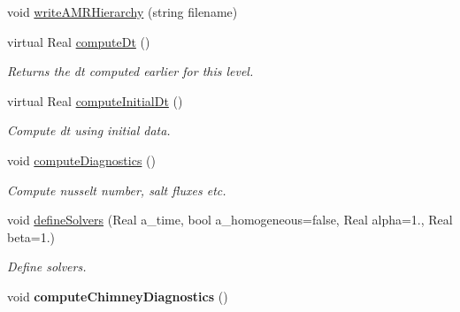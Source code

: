 \begin{DoxyCompactItemize}
\item 
void \hyperlink{class_a_m_r_level_mushy_layer_abedf24a1dd03d1de3c42222da1fcac3d}{write\-A\-M\-R\-Hierarchy} (string filename)
\item 
\hypertarget{class_a_m_r_level_mushy_layer_a3918643e41cb27879557d6cf06ac2f2b}{virtual Real \hyperlink{class_a_m_r_level_mushy_layer_a3918643e41cb27879557d6cf06ac2f2b}{compute\-Dt} ()}\label{class_a_m_r_level_mushy_layer_a3918643e41cb27879557d6cf06ac2f2b}

\begin{DoxyCompactList}\small\item\em Returns the dt computed earlier for this level. \end{DoxyCompactList}\item 
\hypertarget{class_a_m_r_level_mushy_layer_af9995d5aaa7f7ce624b934ba3ad9306c}{virtual Real \hyperlink{class_a_m_r_level_mushy_layer_af9995d5aaa7f7ce624b934ba3ad9306c}{compute\-Initial\-Dt} ()}\label{class_a_m_r_level_mushy_layer_af9995d5aaa7f7ce624b934ba3ad9306c}

\begin{DoxyCompactList}\small\item\em Compute dt using initial data. \end{DoxyCompactList}\item 
\hypertarget{class_a_m_r_level_mushy_layer_ac4dc44ed82584911b5d702070f493c73}{void \hyperlink{class_a_m_r_level_mushy_layer_ac4dc44ed82584911b5d702070f493c73}{compute\-Diagnostics} ()}\label{class_a_m_r_level_mushy_layer_ac4dc44ed82584911b5d702070f493c73}

\begin{DoxyCompactList}\small\item\em Compute nusselt number, salt fluxes etc. \end{DoxyCompactList}\item 
\hypertarget{class_a_m_r_level_mushy_layer_a5fc6a3c2fe287b52b6ab73d265d11cf2}{void \hyperlink{class_a_m_r_level_mushy_layer_a5fc6a3c2fe287b52b6ab73d265d11cf2}{define\-Solvers} (Real a\-\_\-time, bool a\-\_\-homogeneous=false, Real alpha=1., Real beta=1.)}\label{class_a_m_r_level_mushy_layer_a5fc6a3c2fe287b52b6ab73d265d11cf2}

\begin{DoxyCompactList}\small\item\em Define solvers. \end{DoxyCompactList}\item 
\hypertarget{class_a_m_r_level_mushy_layer_af1f23fee3ffae8ab4a84caae3a87c4fc}{void {\bfseries compute\-Chimney\-Diagnostics} ()}\label{class_a_m_r_level_mushy_layer_af1f23fee3ffae8ab4a84caae3a87c4fc}


\end{DoxyCompactItemize}
